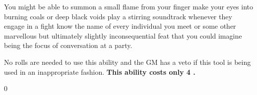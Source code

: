 {{You might be able to summon a small flame from your finger\comma{} make your eyes into burning coals or deep black voids\comma{} play a stirring soundtrack whenever they engage in a fight\comma{} know the name of every individual you meet\comma{} or some other marvellous but ultimately slightly inconsequential feat that you could imagine being the focus of conversation at a party. 

No rolls are needed to use this ability\comma{} and the GM has a veto if this tool is being used in an inappropriate fashion. {\bf This ability costs only 4 .}}{0}{}
	}
